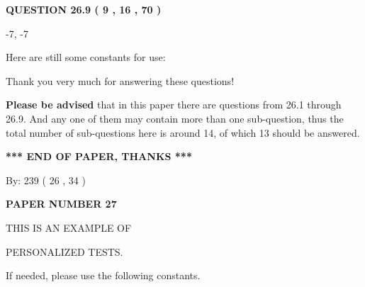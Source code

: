 \documentclass[12pt]{article}
\begin{document}
 
 
  
\vspace{0.2in}
  
{\textbf{\Large{QUESTION
26.9 
 (           9 ,          16 ,          70 )
}}}
  
  


 
 
\noindent{}

-7,  %
-7
 
 
 
   
   
 \vspace{0.2in}
Here are still some constants for use:
 
 
 
 
Thank you very much for answering these questions!
 
{\textbf{\large{Please be advised}}} that in this paper there are questions from
26.1 through
26.9.
And any one of them may contain more than one sub-question, thus the total number
of sub-questions here is around 14, of which
13 should be answered.
 
   
   
   
   
\vspace{1.0in} 
{\textbf{\large{ *** END OF PAPER, THANKS *** }}} 
   
   
\hspace{1.0in} By: 
         239 (          26 ,           34 )
   
   
   
   
\newpage 
\setcounter{page}{ 
    27001 } 
   
   
   
   
 {\textbf{ \Large{ PAPER NUMBER           27  }}}
   
   
\vspace{0.2in}
   
   
   
   
   
   
 \vspace{0.2in}
 
 
{\Huge  THIS IS AN EXAMPLE OF}
 
{\Huge  PERSONALIZED TESTS. }
 
If needed, please use the following constants.
 
 
 
\end{document}

